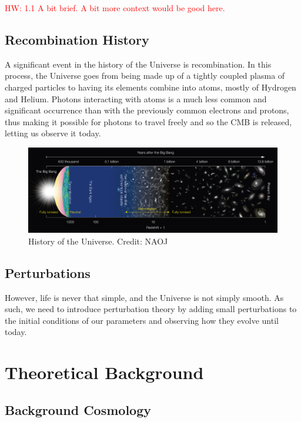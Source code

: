 \documentclass{aa}
\newcommand{\hw}[1]{\textcolor{red}{HW: #1}}
\begin{document}
\hw{1.1 A bit brief. A bit more context would be good here.}

\subsection{Recombination History}

A significant event in the history of the Universe is recombination. In this process, the Universe goes from being made up of a tightly coupled plasma of charged particles to having its elements combine into atoms, mostly of Hydrogen and Helium. Photons interacting with atoms is a much less common and significant occurrence than with the previously common electrons and protons, thus making it possible for photons to travel freely and so the CMB is released, letting us observe it today.

\begin{figure}[ht]
\caption{History of the Universe. Credit: NAOJ}             
\label{fig:history}      
\centering          
\includegraphics[width=\textwidth]{report/figures/eso1620a.jpg}
\end{figure}

\subsection{Perturbations}

However, life is never that simple, and the Universe is not simply smooth. As such, we need to introduce perturbation theory by adding small perturbations to the initial conditions of our parameters and observing how they evolve until today.

\section{Theoretical Background}

\subsection{Background Cosmology}
\end{document}
